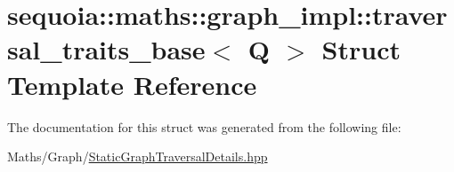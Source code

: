 \hypertarget{structsequoia_1_1maths_1_1graph__impl_1_1traversal__traits__base}{}\section{sequoia\+::maths\+::graph\+\_\+impl\+::traversal\+\_\+traits\+\_\+base$<$ Q $>$ Struct Template Reference}
\label{structsequoia_1_1maths_1_1graph__impl_1_1traversal__traits__base}


The documentation for this struct was generated from the following file\+:\begin{DoxyCompactItemize}
\item 
Maths/\+Graph/\mbox{\hyperlink{_static_graph_traversal_details_8hpp}{Static\+Graph\+Traversal\+Details.\+hpp}}\end{DoxyCompactItemize}
